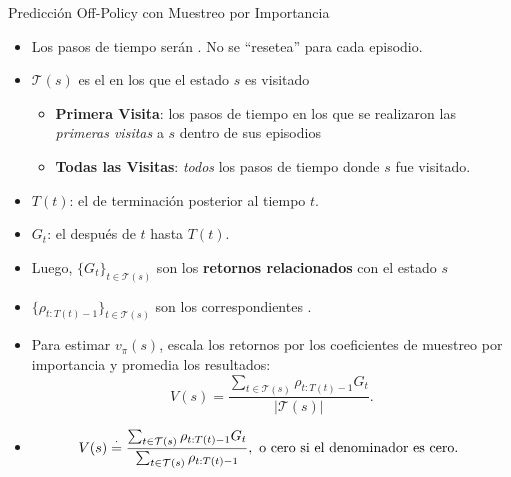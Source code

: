 \documentclass[10pt, envcountsect, handout, aspectratio=1610, hyperref={hypertexnames=true}]{beamer}
\begin{document}
\begin{frame}{Predicción Off-Policy con Muestreo por Importancia}
\begin{itemize}
	\item Los pasos de tiempo serán . No se ``resetea'' para cada episodio.
	
	\item  \( \mathcal{T}(s) \) es el  en los que el estado \( s \) es visitado
		\begin{itemize}
			\item  \textbf{Primera Visita}:  los pasos de tiempo en los que se realizaron las \textit{primeras visitas} a \( s \) dentro de sus episodios
			\item  \textbf{Todas las Visitas}: \textit{todos} los pasos de tiempo donde $s$ fue visitado.
		\end{itemize}

	\item  \( {T}(t) \): el  de terminación posterior al tiempo \( t \).
	
	\item \( G_t \):  el  después de \( t \) hasta \( T(t) \).
	
	\item Luego, \( \{ G_t \}_{t \in \mathcal{T}(s)} \) son los \textbf{retornos relacionados} con el estado \( s \)
	
	\item \( \{ \rho_{t : T(t)-1} \}_{t \in \mathcal{T}(s)} \) son los correspondientes .
	
	\item {} Para estimar \( v_\pi(s) \), escala los retornos por los coeficientes de muestreo por importancia y promedia los resultados:
	\[
	V(s) = \frac{\sum_{t \in \mathcal{T}(s)} \rho_{t:T(t)-1} G_t}{|\mathcal{T}(s)|}.
	\]
	
	\item {}
	\[
	V(s) \stackrel{\cdot}{=} \frac{\sum_{t \in {\cal T}(s)} \rho_{t:T(t)-1} G_t}{\sum_{t \in {\cal T}(s)} \rho_{t:T(t)-1}}, \text{ \color{black} o cero si el denominador es cero. }
	\]
	
	
	
\end{itemize}

\end{frame}
\end{document}
